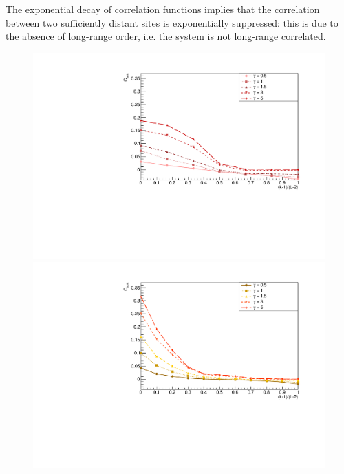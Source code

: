 The exponential decay of correlation functions implies that the correlation between two sufficiently distant sites is exponentially suppressed: this is due to the absence of long-range order, i.e. the system is not long-range correlated.


\begin{figure}
\centering
    \includegraphics[scale=0.55]{Figures/8sites_BulkCF_CONNvsGamma.pdf}
    \includegraphics[scale=0.55]{Figures/12sites_CFBulkCONNVSgamma.pdf}

\end{figure}

